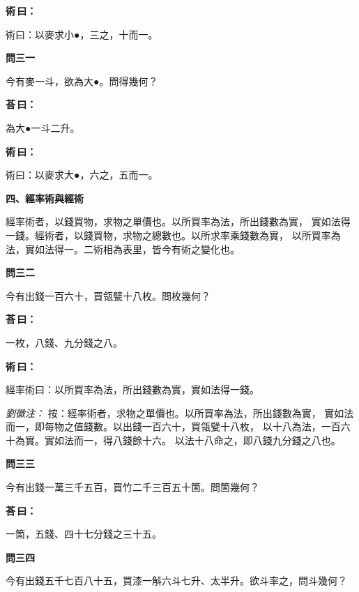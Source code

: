 \documentclass[11pt,a4paper]{article}
\newenvironment{problem}[1][]{%
  \par\vspace{0.6em}\noindent\textcolor{problemcolor}{\textbf{問\ignorespaces#1\unskip}\hspace{0.5em}}%
  \ignorespaces
}{\par\vspace{0.4em}}
\newenvironment{answer}{%
  \par\noindent\textcolor{answercolor}{\textbf{荅\,曰：}}%
  \ignorespaces
}{\par\vspace{0.3em}}
\newenvironment{method}{%
  \par\noindent\textcolor{methodcolor}{\textbf{術\,曰：}}%
  \ignorespaces
}{\par\vspace{0.4em}}
\newenvironment{liuhuicomm}{%
  \par\vspace{0.3em}\noindent\textcolor{commentarycolor}{\small\textit{劉徽注：}}}%
  {\par\vspace{0.5em}}
\begin{document}
\begin{method}
術曰：以麥求小●，三之，十而一。
\end{method}

\begin{problem}[三一]
今有麥一斗，欲為大●。問得幾何？
\end{problem}

\begin{answer}
為大●一斗二升。
\end{answer}

\begin{method}
術曰：以麥求大●，六之，五而一。
\end{method}

\vspace{0.8em}
\noindent\textbf{\large 四、經率術與經術}
\vspace{0.5em}

\noindent 經率術者，以錢買物，求物之單價也。以所買率為法，所出錢數為實，
實如法得一錢。經術者，以錢買物，求物之總數也。以所求率乘錢數為實，
以所買率為法，實如法得一。二術相為表里，皆今有術之變化也。

\begin{problem}[三二]
今有出錢一百六十，買瓴甓十八枚。問枚幾何？
\end{problem}

\begin{answer}
一枚，八錢、九分錢之八。
\end{answer}

\begin{method}
經率術曰：以所買率為法，所出錢數為實，實如法得一錢。
\end{method}

\begin{liuhuicomm}
按：經率術者，求物之單價也。以所買率為法，所出錢數為實，
實如法而一，即每物之值錢數。以出錢一百六十，買瓴甓十八枚，
以十八為法，一百六十為實。實如法而一，得八錢餘十六。
以法十八命之，即八錢九分錢之八也。
\end{liuhuicomm}

\begin{problem}[三三]
今有出錢一萬三千五百，買竹二千三百五十箇。問箇幾何？
\end{problem}

\begin{answer}
一箇，五錢、四十七分錢之三十五。
\end{answer}

\begin{problem}[三四]
今有出錢五千七百八十五，買漆一斛六斗七升、太半升。欲斗率之，問斗幾何？
\end{problem}
\end{document}
